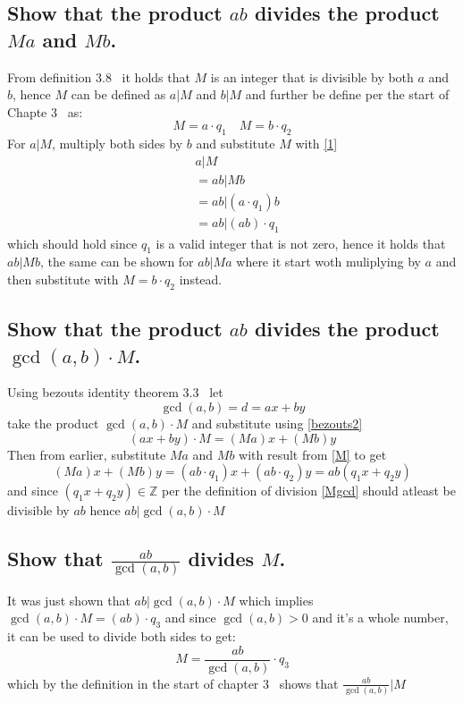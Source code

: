 \documentclass[12pt]{article}
\begin{document}
\subsection*{Show that the product $ab$ divides the product $Ma$ and $Mb$.}
From definition 3.8~\cite{Algebra} it holds that $M$ is an integer that is divisible by both $a$ and $b$,
hence $M$ can be defined as $a | M$ and $b | M$ and further be define per the start of Chapte 3~\cite{Algebra} as:
\begin{equation}\label{1}
 M = a \cdot q_1 \quad M = b \cdot q_2    
\end{equation}
For $a|M$, multiply both sides by $b$ and substitute $M$ with \eqref{1}
\begin{align}\label{M}
    &a|M \\
    &= ab|Mb \\
    &= ab| (a\cdot q_1)b \\
    &= ab | (ab)\cdot q_1
\end{align}
which should hold since $q_1$ is a valid integer that is not zero, hence it holds that $ab|Mb$, the same can be shown for
$ab|Ma$ where  it start woth muliplying by $a$ and then substitute with $M = b \cdot q_2$ instead. 


\subsection*{Show that the product $ab$ divides the product $\gcd(a,b)\cdot M$.}
Using bezouts identity theorem 3.3~\cite{Algebra} let 
\begin{equation}\label{bezouts2}
    \gcd(a,b) = d = ax + by
\end{equation}
take the product $\gcd(a,b)\cdot M$ and substitute using \eqref{bezouts2}
\[
(ax + by) \cdot M = (Ma)x + (Mb)y
\]
Then from earlier, substitute $Ma$ and $Mb$ with result from \eqref{M} to get
\begin{equation}\label{Mgcd}
    (Ma)x + (Mb)y = (ab\cdot q_1)x + (ab\cdot q_2)y = ab(q_1x + q_2y) 
\end{equation}
and since $(q_1x + q_2y) \in \mathbb{Z}$ per the definition of division \eqref{Mgcd} should atleast
be divisible by $ab$ hence $ab|\gcd(a,b)\cdot M$

\subsection*{Show that $\frac{ab}{\gcd(a,b)}$ divides $M$.}
It was just shown that $ab|\gcd(a,b) \cdot M$ which implies $\gcd(a,b) \cdot M = (ab)\cdot q_3$ and since $\gcd(a,b) > 0$ and it's a whole number, it can be used to divide both sides to get:
\[
M = \frac{ab}{\gcd(a,b)} \cdot q_3 
\]
which by the definition in the start of chapter 3~\cite{Algebra} shows that $\frac{ab}{\gcd(a,b)}|M$
\end{document}
